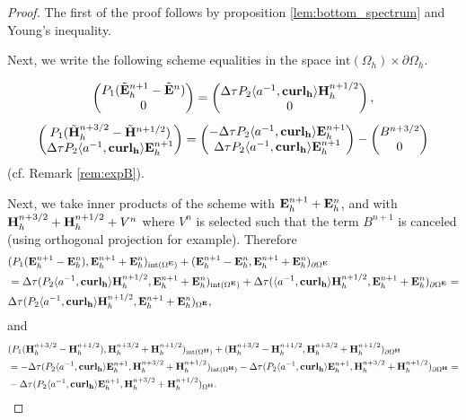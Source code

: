 \documentclass[12pt,reqno]{amsart}
\newcommand{\acurl}{\langle a^{-1},{\bf curl_h}\rangle}
\newcommand{\e}{{\bf E}}
\newcommand{\h}{{\bf H}}
\theoremstyle{definition}
\numberwithin{equation}{section}
\newcommand{\intr}[1]{\mathrm{int}(#1)}
\def\Gw{\Omega}     \def\Gx{\Xi}         \def\Gy{\Psi}
\def\Gwh{\Omega_h}
\begin{document}
\begin{proof}
	The first of the proof follows by proposition \ref{lem:bottom_spectrum} and Young's inequality.
	
Next, we write the following scheme equalities in the space $\intr\Gwh\times \partial \Gwh$.
	
	\begin{align}
		\begin{pmatrix}
		P_{1}(\tilde{\e}_h^{n+1} -\tilde{\e}^{n})\\0
		\end{pmatrix}=
			\begin{pmatrix}
		\Delta \tau P_2 \acurl \h_h^{n+1/2}
		\\0
	\end{pmatrix},
	\end{align}
		\begin{align}
		\begin{pmatrix}
			P_{1}(\tilde{\h}_h^{n+3/2} -\tilde{\h}^{n+1/2})
			\\
		\Delta \tau P_2\acurl\e_h^{n+1}
		\end{pmatrix}=
		\begin{pmatrix}
			-\Delta \tau P_2 \acurl \e_h^{n+1}
			\\	\Delta \tau P_2\acurl\e_h^{n+1}
		\end{pmatrix}-
	\begin{pmatrix}
			B^{n+3/2}\\0
	\end{pmatrix}
	\end{align}
(cf.  Remark \ref{rem:expB}).

	Next, we take inner products of the scheme with $\e_h^{n+1}+\e_h^n$,
	and with 
	$\h_h^{n+3/2}+\h_h^{n+1/2}+V^{n}$
where $V^n$ is selected such that  the term $B^{n+1}$ is canceled (using orthogonal projection for example). Therefore
\begin{align*}
	&
	(P_1(\e^{n+1}_h-\e^{n}_h),\e^{n+1}_h+\e^{n}_h)_{\intr{\Gw^\e}}+
	(\e^{n+1}_h-\e^{n}_h,\e^{n+1}_h+\e^{n}_h)_{\partial{\Gw^\e}}
	\\&
	=
	\Delta \tau(P_2\acurl\h_h^{n+1/2},
	\e^{n+1}_h+\e^{n}_h)_{\intr{\Gw^\e}}+
		\Delta \tau(\acurl\h_h^{n+1/2},
	\e^{n+1}_h+\e^{n}_h)_{\partial{\Gw^\e}}=\\&
		\Delta \tau(P_2\acurl\h_h^{n+1/2},
	\e^{n+1}_h+\e^{n}_h)_{{\Gw^\e}},
\end{align*}
and
\begin{align*}
	&
		(P_1(\h^{n+3/2}_h-\h^{n+1/2}_h),\h^{n+3/2}_h+\h^{n+1/2}_h)_{\intr{\Gw^\h}}
	+
	(\h^{n+3/2}_h-\h^{n+1/2}_h,\h^{n+3/2}_h+\h^{n+1/2}_h)_{\partial{\Gw^\h}}
	\\&= 
		-\Delta \tau(P_2\acurl\e_h^{n+1},
	\h^{n+3/2}_h+\h^{n+1/2}_h)_{\intr{{\Gw^\h}}}-
	\Delta \tau(P_2\acurl\e_h^{n+1},\h^{n+3/2}_h+\h^{n+1/2}_h)_{\partial{\Gw^\h}}=\\&
	-\Delta \tau(P_2\acurl\e_h^{n+1},
	\h^{n+3/2}_h+\h^{n+1/2}_h)_{{{\Gw^\h}}}.
\end{align*}


\end{proof}
\end{document}
